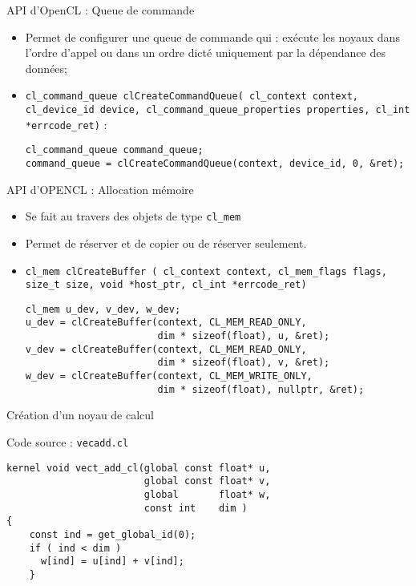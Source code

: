 \documentclass[handout,francais]{beamer}
\begin{document}
\begin{frame}[fragile]{API d'OpenCL : Queue de commande}
\begin{itemize}
\item Permet de configurer une queue de commande qui : exécute les noyaux dans l'ordre
d'appel ou dans un ordre dicté uniquement par la dépendance des données;
\item 
\texttt{cl\_command\_queue clCreateCommandQueue( cl\_context context,
  	cl\_device\_id device,
  	cl\_command\_queue\_properties properties,
  	cl\_int *errcode\_ret)} :

\begin{lstlisting}
cl_command_queue command_queue;
command_queue = clCreateCommandQueue(context, device_id, 0, &ret);
\end{lstlisting}
\end{itemize}
\end{frame}

\begin{frame}[fragile]{API d'OPENCL : Allocation mémoire}

\begin{itemize}
\item Se fait au travers des objets de type \texttt{cl\_mem}
\item Permet de réserver et de copier ou de réserver seulement.
\item \texttt{cl\_mem clCreateBuffer ( cl\_context context,
cl\_mem\_flags flags,
size\_t size,
void *host\_ptr,
cl\_int *errcode\_ret)}
\begin{lstlisting}
cl_mem u_dev, v_dev, w_dev;
u_dev = clCreateBuffer(context, CL_MEM_READ_ONLY, 
                       dim * sizeof(float), u, &ret);
v_dev = clCreateBuffer(context, CL_MEM_READ_ONLY, 
                       dim * sizeof(float), v, &ret);
w_dev = clCreateBuffer(context, CL_MEM_WRITE_ONLY, 
                       dim * sizeof(float), nullptr, &ret);
\end{lstlisting}
\end{itemize}
\end{frame}

\begin{frame}[fragile]{Création d'un noyau de calcul}
\begin{block}{Code source : \texttt{vecadd.cl}}
\begin{lstlisting}
kernel void vect_add_cl(global const float* u,
                        global const float* v,
                        global       float* w,
                        const int    dim )
{
    const ind = get_global_id(0);
    if ( ind < dim )
      w[ind] = u[ind] + v[ind];
    }
\end{lstlisting}
\end{block}
\end{frame}
\end{document}
